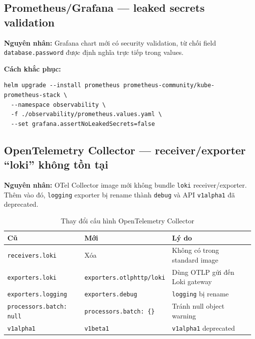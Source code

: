 \subsection{Prometheus/Grafana — leaked secrets validation}

\textbf{Nguyên nhân:} Grafana chart mới có security validation, từ chối field
\texttt{database.password} được định nghĩa trực tiếp trong values.

\textbf{Cách khắc phục:}
\begin{lstlisting}[style=bashstyle]
helm upgrade --install prometheus prometheus-community/kube-prometheus-stack \
  --namespace observability \
  -f ./observability/prometheus.values.yaml \
  --set grafana.assertNoLeakedSecrets=false
\end{lstlisting}

\subsection{OpenTelemetry Collector — receiver/exporter ``loki'' không tồn tại}

\textbf{Nguyên nhân:} OTel Collector image mới không bundle \texttt{loki} receiver/exporter.
Thêm vào đó, \texttt{logging} exporter bị rename thành \texttt{debug} và API
\texttt{v1alpha1} đã deprecated.

\begin{table}[H]
  \centering
  \caption{Thay đổi cấu hình OpenTelemetry Collector}
  \begin{tabularx}{\textwidth}{L{4cm}L{4cm}X}
    \toprule
    \textbf{Cũ} & \textbf{Mới} & \textbf{Lý do} \\
    \midrule
    \texttt{receivers.loki} & Xóa & Không có trong standard image \\
    \texttt{exporters.loki} & \texttt{exporters.otlphttp/loki} & Dùng OTLP gửi đến Loki gateway \\
    \texttt{exporters.logging} & \texttt{exporters.debug} & \texttt{logging} bị rename \\
    \texttt{processors.batch: null} & \texttt{processors.batch: \{\}} & Tránh null object warning \\
    \texttt{v1alpha1} & \texttt{v1beta1} & \texttt{v1alpha1} deprecated \\
    \bottomrule
  \end{tabularx}
\end{table}

